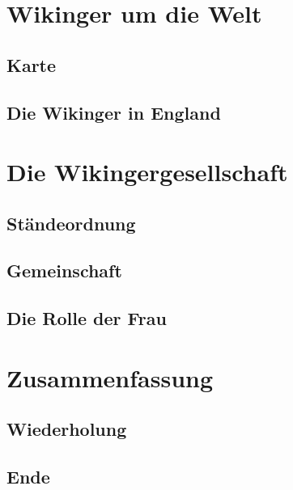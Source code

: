 \documentclass[twoside,12pt,a4paper,ngerman,openany]{book}
\newcommand{\fchapter}[1]{\chapter{#1}\thispagestyle{chapterstyle}}
\begin{document}
\lipsum[6]

\fchapter{Wikinger um die Welt}

\section{Karte} %

\section{Die Wikinger in England}

\lipsum[3]

\fchapter{Die Wikingergesellschaft}

\section{Ständeordnung}

\lipsum[6]

\section{Gemeinschaft}

\lipsum[6]

\section{Die Rolle der Frau} %

\lipsum[6]

\fchapter{Zusammenfassung} %

\section{Wiederholung} %

\lipsum[6]

\section{Ende}

\lipsum[6]
\end{document}
